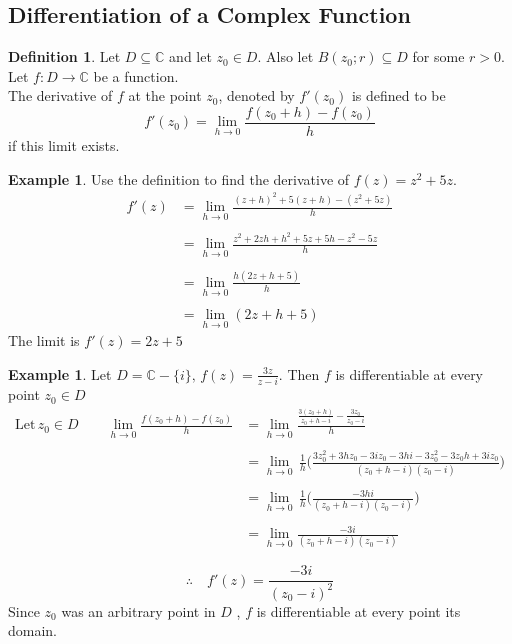 \documentclass[11pt,a4paper]{article}
\theoremstyle{definition}
\newtheorem{definition}[thm]{Definition}
\newtheorem{example}[thm]{Example}
\begin{document}
{\color[wave]{485}\subsection{Differentiation of a Complex Function}}

\begin{definition}
Let $D\subseteq \mathbb{C}$ and let $z_0\in D$. Also let $B(z_0;r)\subseteq D$ for some $r>0$. Let $f:D \longrightarrow \mathbb{C}$ be a function.\\

The derivative of $f$ at the point $z_0$, denoted by $f'(z_0)$  is defined to be $$\boxed{f'(z_0) = \lim\limits_{h \rightarrow 0} \frac{f(z_0 + h) - f(z_0)}{h}}$$ if this limit exists.
\end{definition}

\begin{example}
Use the definition to find the derivative of $f(z) = z^2 + 5z$.\\

\text{\textcolor{red}{Solution}}
\begin{align*}
f'(z) & = \lim\limits_{h \rightarrow 0}\frac{(z + h)^2 + 5(z + h) - (z^2 + 5z)}{h}\\\\
& = \lim\limits_{h \rightarrow 0}\frac{z^2 + 2zh + h^2 + 5z + 5h - z^2 - 5z}{h}\\\\
& = \lim\limits_{h \rightarrow 0}\frac{h( 2z + h + 5)}{h}\\\\
& = \lim\limits_{h \rightarrow 0}(2z + h + 5)
\end{align*}
The limit is $f'(z) = 2z + 5$
\end{example}

\begin{example}
Let $D= \mathbb{C} - \{i\}, \, f(z) = \frac{3z}{z - i}$. Then $f$ is differentiable at every point $z_0 \in D$\\

\text{\textcolor{red}{Solution}}
\begin{align*}
\text{Let}\,z_0 \in D\qquad \lim\limits_{h \rightarrow 0} \frac{f(z_0 + h) - f(z_0)}{h} & = \lim\limits_{h \rightarrow 0}\frac{\frac{3(z_0 + h)}{z_0 + h - i} - \frac{3z_0}{z_0 - i}}{h}\\\\
& = \lim\limits_{h \rightarrow 0}\,\frac{1}{h}\Bigg( \frac{3z^2_0 + 3hz_0 - 3iz_0 - 3hi - 3z^2_0 - 3z_0h + 3iz_0}{(z_0 + h - i ) (z_0 - i)}\Bigg)\\\\
& = \lim\limits_{h \rightarrow 0}\,\frac{1}{h}\Big( \frac{-3hi}{(z_0 + h - i)(z_0 - i)}\Big)\\\\
& = \lim\limits_{h \rightarrow 0} \frac{-3i}{(z_0 + h  - i ) (z_0 - i)}
\end{align*}

$$\therefore\quad  f'(z) = \frac{-3i}{(z_0 - i)^2}$$
Since $z_0$ was an arbitrary point in $D$ , $f$ is differentiable at every point its domain.
\end{example}
\end{document}
